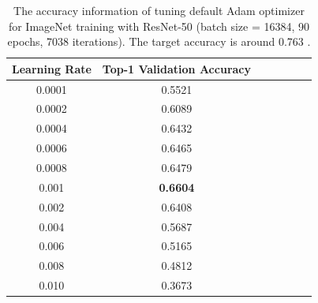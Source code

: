 \begin{table}[ht]
\renewcommand{\arraystretch}{1.3}
\caption{The accuracy information of tuning default Adam optimizer for ImageNet training with ResNet-50 (batch size = 16384, 90 epochs, 7038 iterations). The target accuracy is around 0.763 \citep{goyal2017accurate}.}
\centering
\begin{tabular}{|c|c|c|c|c|c|c|}
\hline
Learning Rate & Top-1 Validation Accuracy \\
\hline
\hline
0.0001 & 0.5521 \\
\hline
0.0002 & 0.6089 \\
\hline
0.0004 & 0.6432 \\
\hline
0.0006 & 0.6465 \\
\hline
0.0008 & 0.6479 \\
\hline
0.001 & {\bf 0.6604} \\
\hline
0.002 & 0.6408 \\
\hline
0.004 & 0.5687 \\
\hline
0.006 & 0.5165 \\
\hline
0.008 & 0.4812 \\
\hline
0.010 & 0.3673 \\
\hline
\end{tabular}
\label{table:imagenet_adam_tuning_1}
\end{table}

